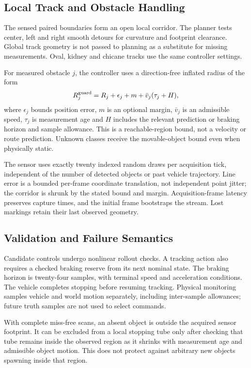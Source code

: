 \documentclass[conference]{IEEEtran}
\begin{document}
\subsection{Local Track and Obstacle Handling}
The sensed paired boundaries form an open local corridor. The planner tests
center, left and right smooth detours for curvature and footprint clearance.
Global track geometry is not passed to planning as a substitute for missing
measurements. Oval, kidney and chicane tracks use the same controller settings.

For measured obstacle $j$, the controller uses a direction-free inflated
radius of the form
\begin{equation}
R_j^{\rm guard}=R_j+\epsilon_j+m+
\bar{v}_j(\tau_j+H),
\label{eq:inflation}
\end{equation}
where $\epsilon_j$ bounds position error, $m$ is an optional margin,
$\bar{v}_j$ is an admissible speed, $\tau_j$ is measurement age and $H$
includes the relevant prediction or braking horizon and sample allowance.
This is a reachable-region bound, not a velocity or route prediction.
Unknown classes receive the movable-object bound even when physically static.

The sensor uses exactly twenty indexed random draws per acquisition tick,
independent of the number of detected objects or past vehicle trajectory.
Line error is a bounded per-frame coordinate translation, not independent
point jitter; the corridor is shrunk by the stated bound and margin.
Acquisition-frame latency preserves capture times, and the initial frame
bootstraps the stream. Lost markings retain their last observed geometry.

\subsection{Validation and Failure Semantics}
Candidate controls undergo nonlinear rollout checks. A tracking action also
requires a checked braking reserve from its next nominal state. The braking
horizon is twenty-four samples, with terminal speed and acceleration
conditions. The vehicle completes stopping before resuming tracking.
Physical monitoring samples vehicle and world motion separately, including
inter-sample allowances; future truth samples are not used to select commands.

With complete miss-free scans, an absent object is outside the acquired
sensor footprint. It can be excluded from a local stopping tube only after
checking that tube remains inside the observed region as it shrinks with
measurement age and admissible object motion. This does not protect against
arbitrary new objects spawning inside that region.
\end{document}
